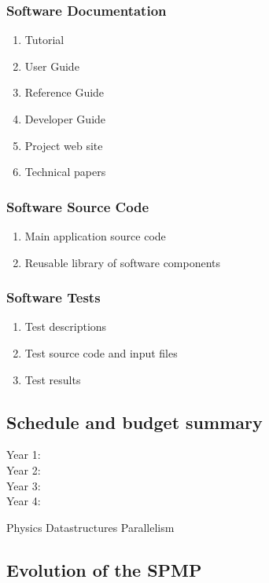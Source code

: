 \documentclass{article}[12pt]
\begin{document}
\subsubsection{Software Documentation}
\begin{enumerate}
\item Tutorial
\item User Guide
\item Reference Guide
\item Developer Guide
\item Project web site
\item Technical papers
\end{enumerate}

\subsubsection{Software Source Code}
\begin{enumerate}
\item Main application source code
\item Reusable library of software components
\end{enumerate}

\subsubsection{Software Tests}
\begin{enumerate}
\item Test descriptions
\item Test source code and input files
\item Test results
\end{enumerate}

\subsection{Schedule and budget summary}


\begin{description}
\item [Year 1: ]
\item [Year 2: ]
\item [Year 3: ]
\item [Year 4: ]
\end{description}

Physics
Datastructures
Parallelism

\subsection{Evolution of the SPMP}
\end{document}
